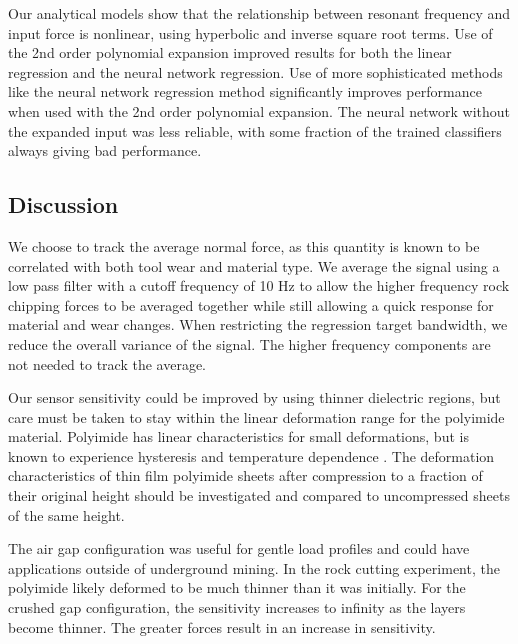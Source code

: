 Our analytical models show that the relationship between resonant frequency and input force
is nonlinear, using hyperbolic and inverse square root terms.
Use of the 2nd order polynomial expansion improved results for both 
the linear regression and the neural network regression. 
Use of more sophisticated methods like the neural network regression method
significantly improves performance when used with the 2nd order polynomial expansion.
The neural network without the expanded input was less reliable, with some fraction of the 
trained classifiers always giving bad performance.

\FloatBarrier

\subsection{Discussion}

We choose to track the average normal force, 
as this quantity is known to be correlated with both tool wear and material type.
We average the signal using a low pass filter with a cutoff frequency of 10 Hz 
to allow the higher frequency rock chipping forces to be averaged together while
still allowing a quick response for material and wear changes.
When restricting the regression target bandwidth, we reduce the overall 
variance of the signal. The higher frequency components are not needed to track the average.

Our sensor sensitivity could be improved by using thinner dielectric regions, but care must be taken 
to stay within the linear deformation range for the polyimide material.
Polyimide has linear characteristics for small deformations, but is known
to experience hysteresis and temperature dependence \cite{ZHANG2012, CHO19971615, 7365229}.
The deformation characteristics of thin film polyimide sheets after compression
to a fraction of their original height should be investigated and compared to 
uncompressed sheets of the same height.

The air gap configuration was useful for gentle load profiles and could have applications 
outside of underground mining.
In the rock cutting experiment, the polyimide likely deformed to be much thinner than it was initially.
For the crushed gap configuration, the sensitivity increases to infinity as the layers
become thinner. 
The greater forces result in an increase in sensitivity.



